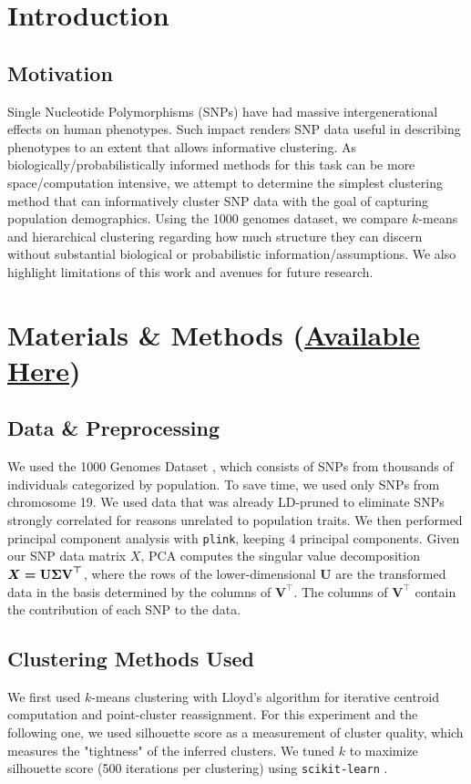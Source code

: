 \documentclass[11pt]{article}
\newcommand{\code}[1]{\texttt{#1}}
\theoremstyle{definition}
\begin{document}
\section{Introduction}\label{sec:intro}
\subsection{Motivation}
\noindent Single Nucleotide Polymorphisms (SNPs) have had massive intergenerational effects on human phenotypes. Such impact renders SNP data useful in describing phenotypes to an extent that allows informative clustering. As biologically/probabilistically informed methods for this task can be more space/computation intensive, we attempt to determine the simplest clustering method that can informatively cluster SNP data with the goal of capturing population demographics. Using the 1000 genomes dataset, we compare $k$-means and hierarchical clustering regarding how much structure they can discern without substantial biological or probabilistic information/assumptions. We also highlight limitations of this work and avenues for future research.

\section{Materials \& Methods (\href {https://github.com/0xArsi/snp-clustering.git}{Available Here})}\label{sec:methods}
\subsection{Data \& Preprocessing}\label{subsec:data}
We used the 1000 Genomes Dataset \cite{1000genomes}, which consists of SNPs from thousands of individuals categorized by population. To save time, we used only SNPs from chromosome 19. We used data that was already LD-pruned to eliminate SNPs strongly correlated for reasons unrelated to population traits. We then performed principal component analysis with \code{plink},  keeping 4 principal components. Given our SNP data matrix $X$, PCA computes the singular value decomposition $X = \textbf{U} \boldmath{\Sigma} \textbf{V}^\top $, where the rows of the lower-dimensional $\textbf{U}$ are the transformed data in the basis determined by the columns of $\textbf{V}^\top$. The columns of $\textbf{V}^\top$ contain the contribution of each SNP to the data.
\subsection{Clustering Methods Used}
\noindent We first used $k$-means clustering with Lloyd's algorithm \cite{lloyd} for iterative centroid computation and point-cluster reassignment. For this experiment and the following one, we used silhouette score \cite{silhouette} as a measurement of cluster quality, which measures the "tightness" of the inferred clusters. We tuned $k$ to maximize silhouette score (500 iterations per clustering) using \code{scikit-learn} \cite{sklearn}.
\end{document}
